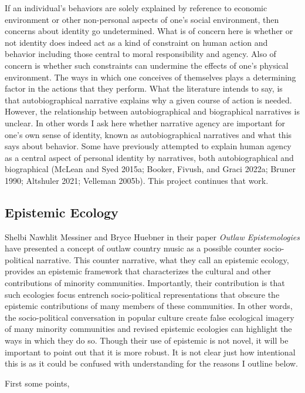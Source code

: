 \documentclass[
  letterpaper,
  DIV=11,
  numbers=noendperiod]{scrartcl}
\theoremstyle{remark}
\begin{document}
If an individual's behaviors are solely explained by reference to
economic environment or other non-personal aspects of one's social
environment, then concerns about identity go undetermined. What is of
concern here is whether or not identity does indeed act as a kind of
constraint on human action and behavior including those central to moral
responsibility and agency. Also of concern is whether such constraints
can undermine the effects of one's physical environment. The ways in
which one conceives of themselves plays a determining factor in the
actions that they perform. What the literature intends to say, is that
autobiographical narrative explains why a given course of action is
needed. However, the relationship between autobiographical and
biographical narratives is unclear. In other words I ask here whether
narrative agency are important for one's own sense of identity, known as
autobiographical narratives and what this says about behavior. Some have
previously attempted to explain human agency as a central aspect of
personal identity by narratives, both autobiographical and biographical
(McLean and Syed 2015a; Booker, Fivush, and Graci 2022a; Bruner 1990;
Altshuler 2021; Velleman 2005b). This project continues that work.

\subsection{Epistemic Ecology}\label{epistemic-ecology}

Shelbi Nawhlit Messiner and Bryce Huebner in their paper \emph{Outlaw
Epistemologies} have presented a concept of outlaw country music as a
possible counter socio-political narrative. This counter narrative, what
they call an epistemic ecology, provides an epistemic framework that
characterizes the cultural and other contributions of minority
communities. Importantly, their contribution is that such ecologies
focus entrench socio-political representations that obscure the
epistemic contributions of many members of these communities. In other
words, the socio-political conversation in popular culture create false
ecological imagery of many minority communities and revised epistemic
ecologies can highlight the ways in which they do so. Though their use
of epistemic is not novel, it will be important to point out that it is
more robust. It is not clear just how intentional this is as it could be
confused with understanding for the reasons I outline below.

First some points,
\end{document}
